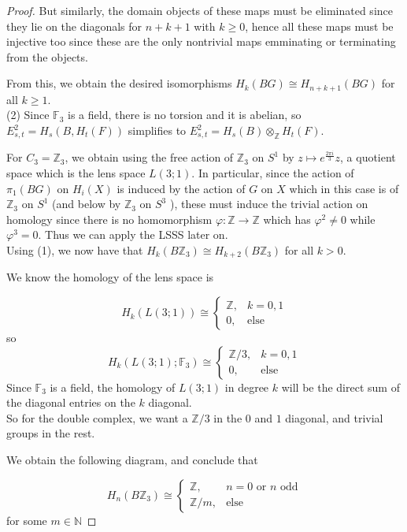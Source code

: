 \documentclass[reqno]{amsart}
\theoremstyle{definition}
\theoremstyle{remark}
\begin{document}
\begin{proof}
But similarly, the domain objects of these maps
must be eliminated since they lie on
the diagonals for $n+k+1$ with $k\ge 0$, hence
all these maps must be injective too since these are
the only nontrivial maps emminating or terminating from
the objects.

From this, we obtain the desired isomorphisms
$H_k (BG) \cong H_{n+k+1}(BG)$ for all
$k\ge 1$.\\
\linebreak
(2) Since $\mathbb{F}_3$ is a field, there is no torsion and
it is abelian,
so $E_{s,t}^2 = 
H_s \left( B, H_t(F) \right) $ simplifies
to $E_{s,t}^2 =
H_s(B) \otimes_{\mathbb{Z}} H_t(F)$.

For $C_3 = \mathbb{Z}_3$, we obtain using the
free action of $\mathbb{Z}_3$ on
$S^{1}$ by
$z \mapsto e^{\frac{2 \pi i}{3}} z$, a
quotient space which is the lens space
$L(3;1) $.
In particular, since the
action of $\pi_1 (BG)$ on $H_i(X)$ is induced
by the action of $G$ on $X$ which in this case
is of $\mathbb{Z}_3$ on $S^{1}$ (and below by $\mathbb{Z}_3$ 
on $S^3$ ), these must induce the trivial action
on homology since there is no
homomorphism
 $\varphi \colon \mathbb{Z} \to \mathbb{Z}$ which has
 $ \varphi^2 \neq 0$ while
 $\varphi^3 = 0$. Thus we can apply
 the LSSS later on.\\
Using (1), we now have that
$H_k(B\mathbb{Z}_3) \cong
H_{k+2}(B\mathbb{Z}_3)$ for all $k>0$.


We know the homology
of the lens space is

\[
H_k \left( L(3;1) \right) 
\cong 
\begin{cases}
    \mathbb{Z},& k=0,1\\
    0,& \text{else}
\end{cases}
\] 
so
\[
H_k \left( L(3;1); \mathbb{F}_3 \right) 
\cong
\begin{cases}
    \mathbb{Z} /3,& k=0,1\\
    0,& \text{else}
\end{cases}
\] 
Since $\mathbb{F}_3$ is a field,
the homology of
$L(3;1)$ in degree $k$ will be the direct sum of the diagonal entries
on the $k$ diagonal.\\
So for the double complex, we want
a $\mathbb{Z}/3$ in the $0$ and $1$ diagonal, and trivial groups
in the rest.

We obtain the following diagram, and conclude that

 \[
H_n\left( B\mathbb{Z}_3 \right) 
\cong
\begin{cases}
    \mathbb{Z},& n=0 \text{ or } n \text{ odd}\\
    \mathbb{Z}/m,& \text{else}
\end{cases}
\] 
for some $m \in \mathbb{N}$


\end{proof}
\end{document}
